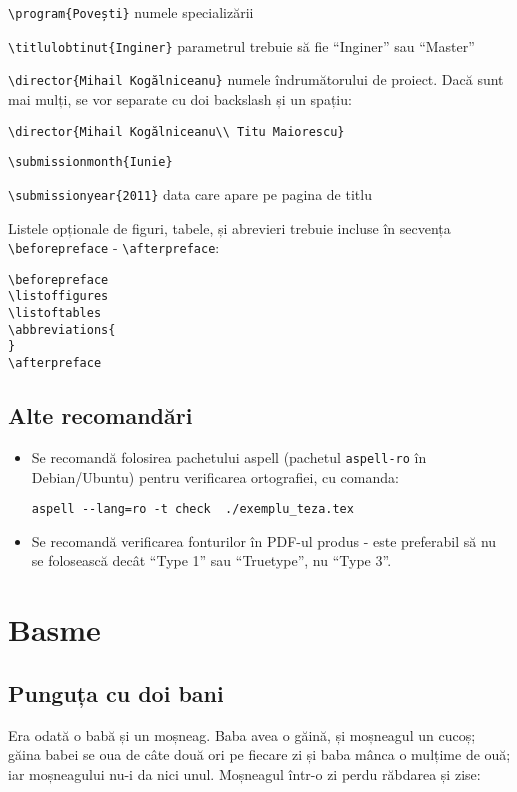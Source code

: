 \documentclass[12pt, a4paper, oneside, romanian]{teza-upb}
\begin{document}
\verb=\program{Povești}= numele specializării

\verb=\titlulobtinut{Inginer}= parametrul trebuie să fie ``Inginer'' sau ``Master''

\verb=\director{Mihail Kogălniceanu}= numele îndrumătorului de
proiect. Dacă sunt mai mulți, se vor separate cu doi backslash și un spațiu: 

\verb=\director{Mihail Kogălniceanu\\ Titu Maiorescu}=

\verb=\submissionmonth{Iunie}=

\verb=\submissionyear{2011}= data care apare pe pagina de titlu

Listele opționale de figuri, tabele, și abrevieri trebuie incluse în secvența \\
\verb=\beforepreface= - \verb=\afterpreface=: 
\begin{verbatim}
\beforepreface
\listoffigures
\listoftables
\abbreviations{
}
\afterpreface
\end{verbatim}
\section{Alte recomandări}
\begin{itemize}
\item Se recomandă folosirea pachetului aspell (pachetul \verb=aspell-ro= în
Debian/Ubuntu) pentru verificarea ortografiei, cu comanda:
{\small \begin{verbatim}aspell --lang=ro -t check  ./exemplu_teza.tex\end{verbatim}}

\item Se recomandă verificarea fonturilor în PDF-ul produs - este preferabil
să nu se folosească decât ``Type 1'' sau ``Truetype'', nu ``Type 3''. 
\end{itemize}

\chapter{Basme}
\section{Punguța cu doi bani}


Era odată o babă și un moșneag. Baba avea o găină, și
moșneagul un cucoș; găina babei se oua de câte două ori pe fiecare zi
și baba mânca o mulțime de ouă; iar moșneagului nu-i da nici
unul. Moșneagul într-o zi perdu răbdarea și zise:
\end{document}
